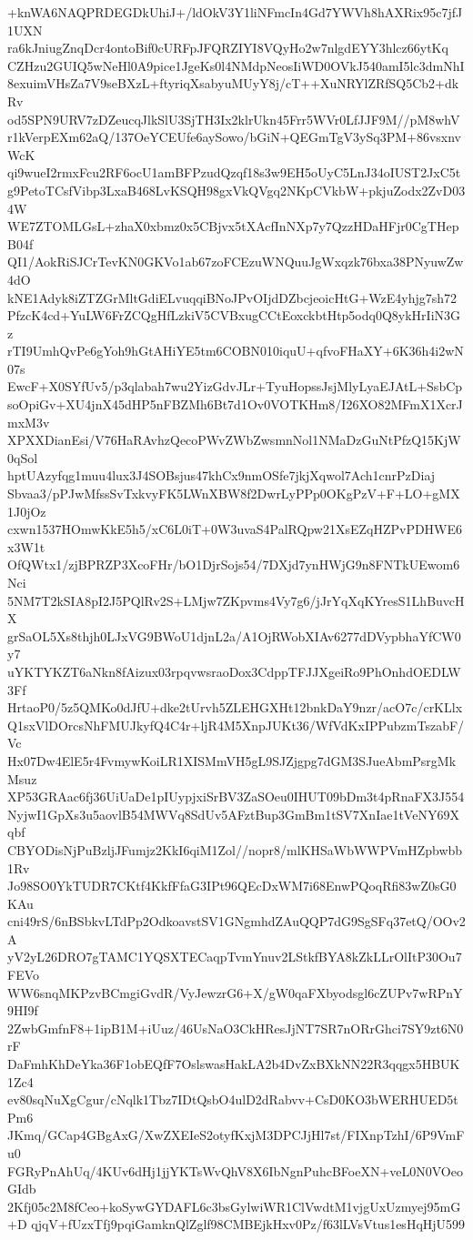 +knWA6NAQPRDEGDkUhiJ+/ldOkV3Y1liNFmcIn4Gd7YWVh8hAXRix95c7jfJ1UXN
ra6kJniugZnqDcr4ontoBif0cURFpJFQRZIYI8VQyHo2w7nlgdEYY3hlcz66ytKq
CZHzu2GUIQ5wNeHl0A9pice1JgeKs0l4NMdpNeosIiWD0OVkJ540amI5lc3dmNhI
8exuimVHsZa7V9seBXzL+ftyriqXsabyuMUyY8j/cT++XuNRYlZRfSQ5Cb2+dkRv
od5SPN9URV7zDZeucqJlkSlU3SjTH3Ix2klrUkn45Frr5WVr0LfJJF9M//pM8whV
r1kVerpEXm62aQ/137OeYCEUfe6aySowo/bGiN+QEGmTgV3ySq3PM+86vsxnvWcK
qi9wueI2rmxFcu2RF6ocU1amBFPzudQzqf18s3w9EH5oUyC5LnJ34oIUST2JxC5t
g9PetoTCsfVibp3LxaB468LvKSQH98gxVkQVgq2NKpCVkbW+pkjuZodx2ZvD034W
WE7ZTOMLGsL+zhaX0xbmz0x5CBjvx5tXAcfInNXp7y7QzzHDaHFjr0CgTHepB04f
QI1/AokRiSJCrTevKN0GKVo1ab67zoFCEzuWNQuuJgWxqzk76bxa38PNyuwZw4dO
kNE1Adyk8iZTZGrMltGdiELvuqqiBNoJPvOIjdDZbcjeoicHtG+WzE4yhjg7sh72
PfzcK4cd+YuLW6FrZCQgHfLzkiV5CVBxugCCtEoxckbtHtp5odq0Q8ykHrIiN3Gz
rTI9UmhQvPe6gYoh9hGtAHiYE5tm6COBN010iquU+qfvoFHaXY+6K36h4i2wN07s
EwcF+X0SYfUv5/p3qlabah7wu2YizGdvJLr+TyuHopssJsjMlyLyaEJAtL+SsbCp
soOpiGv+XU4jnX45dHP5nFBZMh6Bt7d1Ov0VOTKHm8/I26XO82MFmX1XcrJmxM3v
XPXXDianEsi/V76HaRAvhzQecoPWvZWbZwsmnNol1NMaDzGuNtPfzQ15KjW0qSol
hptUAzyfqg1muu4lux3J4SOBsjus47khCx9nmOSfe7jkjXqwol7Ach1cnrPzDiaj
Sbvaa3/pPJwMfssSvTxkvyFK5LWnXBW8f2DwrLyPPp0OKgPzV+F+LO+gMX1J0jOz
cxwn1537HOmwKkE5h5/xC6L0iT+0W3uvaS4PalRQpw21XsEZqHZPvPDHWE6x3W1t
OfQWtx1/zjBPRZP3XcoFHr/bO1DjrSojs54/7DXjd7ynHWjG9n8FNTkUEwom6Nci
5NM7T2kSIA8pI2J5PQlRv2S+LMjw7ZKpvms4Vy7g6/jJrYqXqKYresS1LhBuvcHX
grSaOL5Xs8thjh0LJxVG9BWoU1djnL2a/A1OjRWobXIAv6277dDVypbhaYfCW0y7
uYKTYKZT6aNkn8fAizux03rpqvwsraoDox3CdppTFJJXgeiRo9PhOnhdOEDLW3Ff
HrtaoP0/5z5QMKo0dJfU+dke2tUrvh5ZLEHGXHt12bnkDaY9nzr/acO7c/crKLlx
Q1sxVlDOrcsNhFMUJkyfQ4C4r+ljR4M5XnpJUKt36/WfVdKxIPPubzmTszabF/Vc
Hx07Dw4ElE5r4FvmywKoiLR1XISMmVH5gL9SJZjgpg7dGM3SJueAbmPsrgMkMsuz
XP53GRAac6fj36UiUaDe1pIUypjxiSrBV3ZaSOeu0IHUT09bDm3t4pRnaFX3J554
NyjwI1GpXs3u5aovlB54MWVq8SdUv5AFztBup3GmBm1tSV7XnIae1tVeNY69Xqbf
CBYODisNjPuBzljJFumjz2KkI6qiM1Zol//nopr8/mlKHSaWbWWPVmHZpbwbb1Rv
Jo98SO0YkTUDR7CKtf4KkfFfaG3IPt96QEcDxWM7i68EnwPQoqRfi83wZ0sG0KAu
cni49rS/6nBSbkvLTdPp2OdkoavstSV1GNgmhdZAuQQP7dG9SgSFq37etQ/OOv2A
yV2yL26DRO7gTAMC1YQSXTECaqpTvmYnuv2LStkfBYA8kZkLLrOlItP30Ou7FEVo
WW6snqMKPzvBCmgiGvdR/VyJewzrG6+X/gW0qaFXbyodsgl6cZUPv7wRPnY9HI9f
2ZwbGmfnF8+1ipB1M+iUuz/46UsNaO3CkHResJjNT7SR7nORrGhci7SY9zt6N0rF
DaFmhKhDeYka36F1obEQfF7OslswasHakLA2b4DvZxBXkNN22R3qqgx5HBUK1Zc4
ev80sqNuXgCgur/cNqlk1Tbz7IDtQsbO4ulD2dRabvv+CsD0KO3bWERHUED5tPm6
JKmq/GCap4GBgAxG/XwZXEIeS2otyfKxjM3DPCJjHl7st/FIXnpTzhI/6P9VmFu0
FGRyPnAhUq/4KUv6dHj1jjYKTsWvQhV8X6IbNgnPuhcBFoeXN+veL0N0VOeoGIdb
2Kfj05c2M8fCeo+koSywGYDAFL6c3bsGylwiWR1ClVwdtM1vjgUxUzmyej95mG+D
qjqV+fUzxTfj9pqiGamknQlZglf98CMBEjkHxv0Pz/f63lLVsVtus1esHqHjU599
